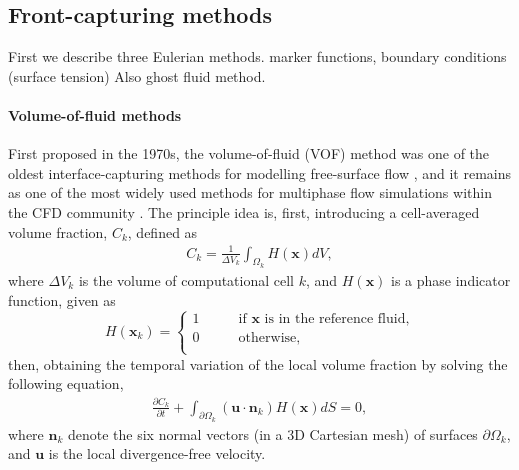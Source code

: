 \subsection{Front-capturing methods}

First we describe three Eulerian methods.
marker functions, boundary conditions (surface tension) \citep{Brackbill_JCP_1992}
Also ghost fluid method.

\medskip
\paragraph{\bf Volume-of-fluid methods}

First proposed in the 1970s, the volume-of-fluid (VOF) method was one of the oldest interface-capturing methods for modelling free-surface flow \citep{Debar1974, hirt_nichols_1975, hirt_nichols_1981a}, and it remains as one of the most widely used methods for multiphase flow simulations within the CFD community \citep{Scardovelli_Zaleski_1999, gerris, pilliod_puckett_2004, xiao_honma_kono_2005a, mthinc2012, paris2019}.
The principle idea is, first, introducing a cell-averaged volume fraction, $C_{k}$, defined as
\begin{equation}
 \begin{aligned}
   C_{k} = \frac{1}{\Delta V_k} \int_{\Omega_k} H(\bm{x}) dV,
 \end{aligned}
\end{equation}
where $\Delta V_k$ is the volume of computational cell $k$, and $H(\bm{x})$ is a phase indicator function, given as
\begin{equation}
    H(\bm{x}_k)=
    \begin{cases}
        1 \quad \quad & \textrm{if $\bm{x}$ is in the reference fluid,} \\
        0 \quad & \textrm{otherwise}, \\
    \end{cases}
\end{equation}
then, obtaining the temporal variation of the local volume fraction by solving the following equation,
\begin{equation} \label{eq:vof-advect}
 \begin{aligned}
   \frac{\partial C_{k}}{\partial t} + \int_{\partial \Omega_k} (\bm{u \cdot n}_k) H(\bm{x}) dS =0,
 \end{aligned}
\end{equation}
where $\bm{n}_k$ denote the six normal vectors (in a 3D Cartesian mesh) of surfaces $\partial \Omega_k$, and $\bm u$ is the local divergence-free velocity.

